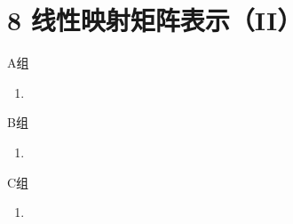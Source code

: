 \section*{8 线性映射矩阵表示（II）}

\vspace{2ex}

\centerline{\heiti A组}
\begin{enumerate}
    \item
\end{enumerate}

\centerline{\heiti B组}
\begin{enumerate}
    \item
\end{enumerate}

\centerline{\heiti C组}
\begin{enumerate}
    \item
\end{enumerate}

\clearpage
